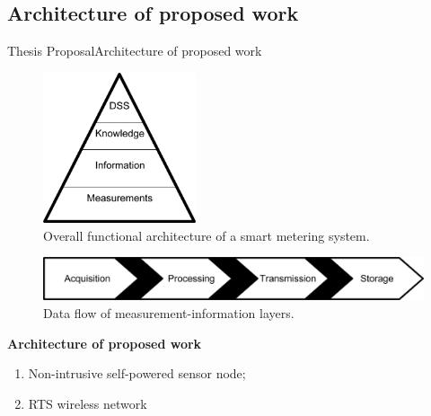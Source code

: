 \subsection{Architecture of proposed work}

\begin{frame}{Thesis Proposal}{Architecture of proposed work}
	
	\begin{minipage}[t]{0.48\linewidth}
\vspace{-2em}
		\begin{figure}[ht!]
			\centering
			\includegraphics[width=0.4\textwidth,keepaspectratio]{figures/40.Method/pyramid}
			\caption{Overall functional architecture of a smart metering system.}
		\end{figure}

	\end{minipage}\hfill
	\begin{minipage}[t]{0.48\linewidth}
		
		\vspace{2em}
		\begin{figure}[ht!]
			\centering

			\includegraphics[width=\textwidth,keepaspectratio]{figures/40.Method/data_flow}
			\caption{Data flow of measurement-information layers.}
		\end{figure}
	\end{minipage}
\pause
\begin{block}{\textbf{Architecture of proposed work}}
	
		\begin{enumerate}
		\item  Non-intrusive self-powered sensor node;
		\item  RTS wireless network
	\end{enumerate}
		
	
		

	
\end{block}
\end{frame}

